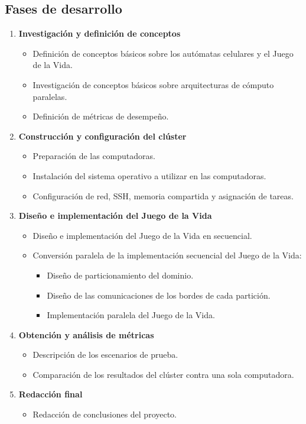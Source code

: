 \subsection{Fases de desarrollo}
\label{section:fasdes}

\begin{enumerate}
  \item \textbf{Investigación y definición de conceptos} %
  \begin{itemize}
    \item Definición de conceptos básicos sobre los autómatas celulares y el Juego de la Vida.
    \item Investigación de conceptos básicos sobre arquitecturas de cómputo paralelas.
    \item Definición de métricas de desempeño.
  \end{itemize}
  \item \textbf{Construcción y configuración del clúster} %
  \begin{itemize}
    \item Preparación de las computadoras.
    \item Instalación del sistema operativo a utilizar en las computadoras.
    \item Configuración de red, SSH, memoria compartida y asignación de tareas.
  \end{itemize}
  \item \textbf{Diseño e implementación del Juego de la Vida} %
  \begin{itemize}
    \item Diseño e implementación del Juego de la Vida en secuencial.
    \item Conversión paralela de la implementación secuencial del Juego de la Vida:
    \begin{itemize}
      \item Diseño de particionamiento del dominio.
      \item Diseño de las comunicaciones de los bordes de cada partición.
      \item Implementación paralela del Juego de la Vida.
    \end{itemize}
  \end{itemize}
  \item \textbf{Obtención y análisis de métricas} %
  \begin{itemize}
    \item Descripción de los escenarios de prueba.
    \item Comparación de los resultados del clúster contra una sola computadora.
  \end{itemize}
  \item \textbf{Redacción final} %
  \begin{itemize}
    \item Redacción de conclusiones del proyecto.
  \end{itemize}
\end{enumerate}